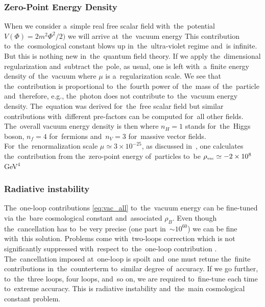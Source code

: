 \subsubsection{Zero-Point Energy Density}
When we consider a~simple real free scalar field with~the~potential $V(\Phi)=2m^2\Phi^2/2)$ we will arrive at~the~vacuum energy
This contribution to~the~cosmological constant blows up in~the~ultra-violet regime and~is infinite. But this is nothing new in~the~quantum field theory. If we apply the~dimensional regularization \parencite{tHooft:1972tcz} and~subtract the~pole, as usual, one is left with~a~finite energy density of~the~vacuum
where $\mu$ is a~regularization scale. We see that the~contribution is proportional to~the~fourth power of~the~mass of~the~particle and~therefore, e.g., the~photon does not contribute to~the~vacuum energy density. The~equation was derived for~the~free scalar field but similar contributions with~different pre-factors can be computed for~all other fields. The~overall vacuum energy density is then
where $n_H=1$ stands for~the~Higgs boson, $n_f=4$ for~fermions and~$n_V=3$ for~massive vector fields. For~the~renormalization scale $\mu\simeq3\times10^{-25}$, as discussed in~\textcite{2011arXiv1105.6296K}, one calculates the~contribution from the~zero-point energy of~particles to~be  $\rho_\text{\tiny vac}\simeq-2\times10^8$ GeV$^4$
\subsubsection{Radiative instability}
The~one-loop contributions \eqref{eq:vac_all} to~the~vacuum energy can be fine-tuned via the~bare cosmological constant and~associated $\rho_B$. Even though the~cancellation has to~be very precise (one part in~$\sim10^{60}$) we can be fine with~this solution. Problems come with~two-loops correction which is not significantly suppressed with~respect to~the~one-loop contribution \parencite{2012CRPhy..13..566M}. The~cancellation imposed at~one-loop is spoilt and~one must retune the~finite contributions in~the~counterterm to~similar degree of~accuracy. If we go further, to~the~three loops, four loops, and~so on, we are required to~fine-tune each time to~extreme accuracy. This is radiative instability and~the~main cosmological constant problem.

